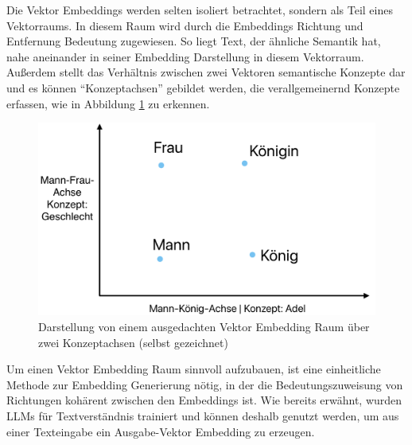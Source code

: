 \documentclass[../main.tex]{subfiles}
\begin{document}
Die Vektor Embeddings werden selten isoliert betrachtet, sondern als Teil eines Vektorraums.
In diesem Raum wird durch die Embeddings Richtung und Entfernung Bedeutung zugewiesen.
So liegt Text, der ähnliche Semantik hat, nahe aneinander in seiner Embedding Darstellung in diesem Vektorraum.
Außerdem stellt das Verhältnis zwischen zwei Vektoren semantische Konzepte dar und es können \enquote{Konzeptachsen} gebildet werden, die verallgemeinernd Konzepte erfassen, wie in Abbildung \ref{fig:embeddingspace} zu erkennen.
\cite{heimerl2018interactive,mikolov2013efficient}

\begin{figure}[ht]
    \centering
    \includegraphics[scale=.23]{"bilder/embeddingspace.png"}
    \caption{Darstellung von einem ausgedachten Vektor Embedding Raum über zwei Konzeptachsen (selbst gezeichnet)}
    \label{fig:embeddingspace}
\end{figure}

Um einen Vektor Embedding Raum sinnvoll aufzubauen, ist eine einheitliche Methode zur Embedding Generierung nötig, in der die Bedeutungszuweisung von Richtungen kohärent zwischen den Embeddings ist.
Wie bereits erwähnt, wurden \glspl{LLM} für Textverständnis trainiert und können deshalb genutzt werden, um aus einer Texteingabe ein Ausgabe-Vektor Embedding zu erzeugen.
\cite{zhang2023language}
\end{document}
